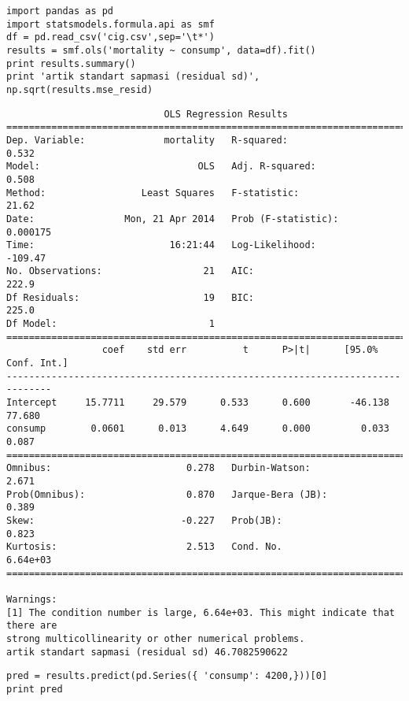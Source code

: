 \documentclass[12pt,fleqn]{article}\usepackage{../common}
\begin{document}
\begin{verbatim}
import pandas as pd
import statsmodels.formula.api as smf
df = pd.read_csv('cig.csv',sep='\t*')
results = smf.ols('mortality ~ consump', data=df).fit()
print results.summary()
print 'artik standart sapmasi (residual sd)', np.sqrt(results.mse_resid)
\end{verbatim}

\begin{verbatim}
                            OLS Regression Results                            
==============================================================================
Dep. Variable:              mortality   R-squared:                       0.532
Model:                            OLS   Adj. R-squared:                  0.508
Method:                 Least Squares   F-statistic:                     21.62
Date:                Mon, 21 Apr 2014   Prob (F-statistic):           0.000175
Time:                        16:21:44   Log-Likelihood:                -109.47
No. Observations:                  21   AIC:                             222.9
Df Residuals:                      19   BIC:                             225.0
Df Model:                           1                                         
==============================================================================
                 coef    std err          t      P>|t|      [95.0% Conf. Int.]
------------------------------------------------------------------------------
Intercept     15.7711     29.579      0.533      0.600       -46.138    77.680
consump        0.0601      0.013      4.649      0.000         0.033     0.087
==============================================================================
Omnibus:                        0.278   Durbin-Watson:                   2.671
Prob(Omnibus):                  0.870   Jarque-Bera (JB):                0.389
Skew:                          -0.227   Prob(JB):                        0.823
Kurtosis:                       2.513   Cond. No.                     6.64e+03
==============================================================================

Warnings:
[1] The condition number is large, 6.64e+03. This might indicate that there are
strong multicollinearity or other numerical problems.
artik standart sapmasi (residual sd) 46.7082590622
\end{verbatim}

\begin{verbatim}
pred = results.predict(pd.Series({ 'consump': 4200,}))[0]
print pred
\end{verbatim}
\end{document}
